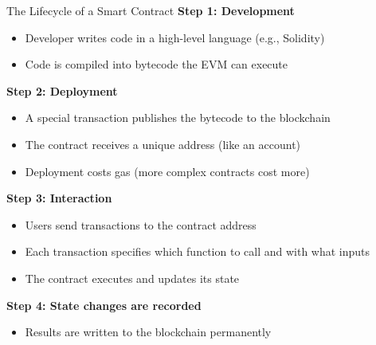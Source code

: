 \documentclass[10pt]{beamer}
\begin{document}
\begin{frame}{The Lifecycle of a Smart Contract}
  \textbf{Step 1: Development}
  \begin{itemize}
    \item Developer writes code in a high-level language (e.g., Solidity)
    \item Code is compiled into bytecode the EVM can execute
  \end{itemize}
  
  \vspace{0.5em}
  \textbf{Step 2: Deployment}
  \begin{itemize}
    \item A special transaction publishes the bytecode to the blockchain
    \item The contract receives a unique address (like an account)
    \item Deployment costs gas (more complex contracts cost more)
  \end{itemize}
  
  \vspace{0.5em}
  \textbf{Step 3: Interaction}
  \begin{itemize}
    \item Users send transactions to the contract address
    \item Each transaction specifies which function to call and with what inputs
    \item The contract executes and updates its state
  \end{itemize}
  
  \vspace{0.5em}
  \textbf{Step 4: State changes are recorded}
  \begin{itemize}
    \item Results are written to the blockchain permanently
  \end{itemize}
\end{frame}
\end{document}
